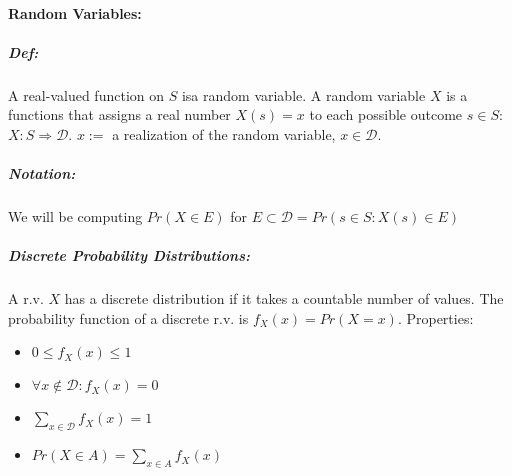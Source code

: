 \documentclass[landscape,10pt]{article}
\begin{document}
\begin{multicols}{3}
        \paragraph*{Random Variables:}
            \subparagraph*{Def:}
                A real-valued function on $S$ isa  random variable. A random variable $X$ is a functions that assigns a real number $X(s)=x$ to each possible outcome $s \in S$: $X:S \Rightarrow \mathcal{D}$. $x:=$ a realization of the random variable, $x \in \mathcal{D}$.
            \subparagraph*{Notation: } 
                We will be computing $Pr(X \in E)$ for $E \subset \mathcal{D} = Pr(s \in S: X(s) \in E)$
            \subparagraph*{Discrete Probability Distributions: }
                A r.v. $X$ has a discrete distribution if it takes a countable number of values. The probability function of a discrete r.v. is $f_X(x) = Pr(X=x)$. Properties:

                \begin{itemize}
                    \item[] $0 \leq f_X(x) \leq 1$
                    \item[] $\forall x \notin \mathcal{D}: f_X(x) = 0$
                    \item[] $\sum\limits_{x \in \mathcal{D}} f_X(x) = 1$
                    \item[] $Pr(X \in A) = \sum\limits_{x \in A} f_X (x)$
                \end{itemize}


\end{multicols}
\end{document}
